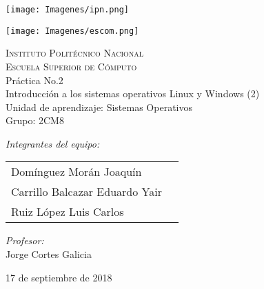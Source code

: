 \documentclass[12pt]{article}
\begin{document}
		\begin{titlepage}
			\begin{center}
				\noindent
				\begin{minipage}{0.5\textwidth}
					\begin{flushleft} \large
					\texttt{[image: Imagenes/ipn.png]}
					\end{flushleft}
				\end{minipage}%
				\begin{minipage}{0.55\textwidth}
					\begin{flushright} \large
			       	\texttt{[image: Imagenes/escom.png]}
					\end{flushright}
				\end{minipage}
				\textsc{\LARGE Instituto Politécnico Nacional}\\[0.5cm]
				\textsc{\Large Escuela Superior de Cómputo}\\[1cm]
				{ \huge Práctica No.2 \\[1cm] }
				{\huge Introducción a los sistemas operativos Linux y Windows (2)\\[1cm]}
				{ \Large Unidad de aprendizaje: Sistemas Operativos} \\[1cm]
				{ \Large Grupo: 2CM8 } \\[1cm]
				\noindent
				\begin{minipage}{0.5\textwidth}
					\begin{flushleft} \large
						\emph{Integrantes del equipo:}\\
						\begin{tabular}{ll}
					     Domínguez Morán Joaquín\\
					     Carrillo Balcazar Eduardo Yair\\
					     Ruiz López Luis Carlos\\
					\end{tabular}
					\end{flushleft}
				\end{minipage}%
				\begin{minipage}{0.5\textwidth}
					\begin{flushright} \large
						\emph{Profesor:} \\
						Jorge Cortes Galicia 
					\end{flushright}
				\end{minipage}
				
				\vfill
				{\large 17 de septiembre de 2018}
			\end{center}
		\end{titlepage}
		
\end{document}

